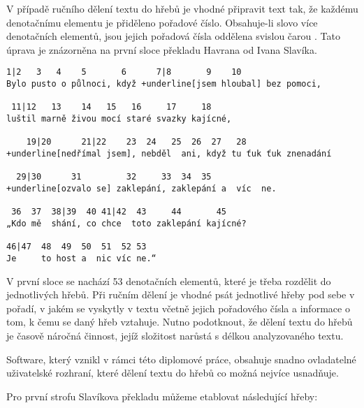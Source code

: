 \documentclass[dp.tex]{subfiles}
\begin{document}
V případě ručního dělení textu do hřebů je vhodné připravit text tak, že každému denotačnímu elementu je přiděleno pořadové číslo. Obsahuje-li slovo více denotačních elementů, jsou jejich pořadová čísla oddělena svislou čarou \uv{|}. Tato úprava je znázorněna na první sloce překladu Havrana od Ivana Slavíka.

\begin{samepage}
\begin{Verbatim}[commandchars=+\[\]]
 1|2   3   4    5       6      7|8       9    10
Bylo pusto o půlnoci, když +underline[jsem hloubal] bez pomoci,

 11|12   13    14   15   16     17     18
luštil marně živou mocí staré svazky kajícné,

    19|20      21|22    23  24   25  26  27   28
+underline[nedřímal jsem], nebděl  ani, když tu ťuk ťuk znenadání

  29|30      31         32     33  34  35
+underline[ozvalo se] zaklepání, zaklepání a  víc  ne.

 36  37  38|39  40 41|42  43     44       45
„Kdo mě  shání, co chce  toto zaklepání kajícné?

46|47  48  49  50  51  52 53
Je     to host a  nic víc ne.“
\end{Verbatim}
\end{samepage}

V první sloce se nachází 53 denotačních elementů, které je třeba rozdělit do jednotlivých hřebů. Při ručním dělení je vhodné psát jednotlivé hřeby pod sebe v pořadí, v jakém se vyskytly v textu včetně jejich pořadového čísla a informace o tom, k čemu se daný hřeb vztahuje. Nutno podotknout, že dělení textu do hřebů je časově náročná činnost, jejíž složitost narůstá s délkou analyzovaného textu.

Software, který vznikl v rámci této diplomové práce, obsahuje snadno ovladatelné uživatelské rozhraní, které dělení textu do hřebů co možná nejvíce usnadňuje.

Pro první strofu Slavíkova překladu můžeme etablovat následující hřeby:
\end{document}
